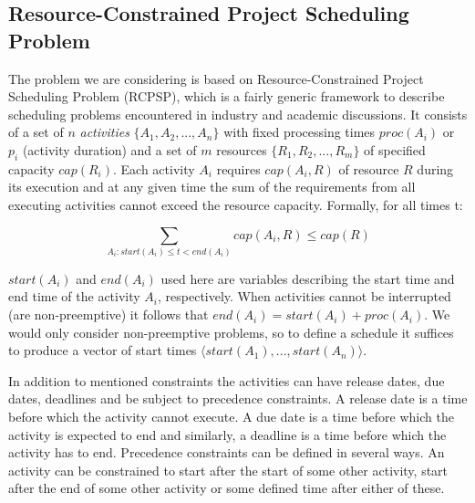 \documentclass{article}
\theoremstyle{definition}
\begin{document}
\subsection{Resource-Constrained Project Scheduling Problem}
The problem we are considering is based on Resource-Constrained Project Scheduling Problem (RCPSP), which is a fairly generic framework to describe scheduling problems encountered in industry and academic discussions. It consists of a set of $n$ \textit{activities} $\{A_1, A_2, ..., A_n\}$ with fixed processing times $proc(A_i)$ or $p_i$ (activity duration) and a set of $m$ resources $\{R_1, R_2, ..., R_m\}$ of specified capacity $cap(R_i)$. Each activity $A_i$ requires $cap(A_i, R)$ of resource $R$ during its execution and at any given time the sum of the requirements from all executing activities cannot exceed the resource capacity. Formally, for all times t:

$$
\sum_{A_i : start(A_i) \leq t < end(A_i)} cap(A_i, R) \leq cap(R)
$$

$start(A_i)$ and $end(A_i)$ used here are variables describing the start time and end time of the activity $A_i$, respectively. When activities cannot be interrupted (are non-preemptive) it follows that $end(A_i) = start(A_i) + proc(A_i)$. We would only consider non-preemptive problems, so to define a schedule it suffices to produce a vector of start times $\langle start(A_1), ..., start(A_n)\rangle$.

In addition to mentioned constraints the activities can have release dates, due dates, deadlines and be subject to precedence constraints. A release date is a time before which the activity cannot execute. A due date is a time before which the activity is expected to end and similarly, a deadline is a time before which the activity has to end. Precedence constraints can be defined in several ways. An activity can be constrained to start after the start of some other activity, start after the end of some other activity or some defined time after either of these.






\end{document}
